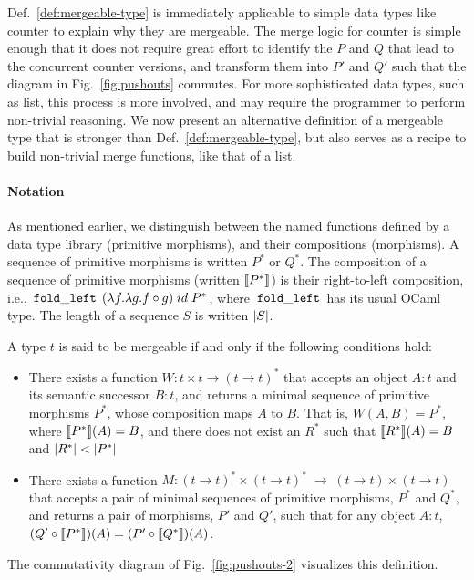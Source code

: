 Def.~\ref{def:mergeable-type} is immediately applicable to simple data
types like counter to explain why they are mergeable. The merge logic
for counter is simple enough that it does not require great effort to
identify the $P$ and $Q$ that lead to the concurrent counter versions,
and transform them into $P'$ and $Q'$ such that the diagram in
Fig.~\ref{fig:pushouts} commutes. For more
sophisticated data types, such as list, this process is more involved,
and may require the programmer to perform non-trivial reasoning. We
now present an alternative definition of a mergeable type that is
stronger than Def.~\ref{def:mergeable-type}, but also serves as a
recipe to build non-trivial merge functions, like that of a list.

\paragraph{Notation} As mentioned earlier, we distinguish between the
named functions defined by a data type library (primitive morphisms),
and their compositions (morphisms). A sequence of primitive morphisms
is written $P^*$ or $Q^*$. The composition of a sequence of primitive
morphisms (written $\llbracket P^* \rrbracket$) is their right-to-left composition,
i.e., $\,{\tt fold\_left}\,\;(\lambda f.\lambda g. f \circ g)\; id\; P^*$,
where $\,{\tt fold\_left}\,$ has its usual OCaml type. The length of a
sequence $S$ is written $\left|S\right|$.

\begin{definition} 
\label{def:mergeable-type-2}
A type $t$ is said to be mergeable if and only if the following
conditions hold:
\begin{itemize}
  \item There exists a function $W: t \times t \rightarrow (t
  \rightarrow t)^*$ that accepts an object $A:t$ and its
  semantic successor $B:t$, and returns a minimal sequence of
  primitive morphisms $P^*$, whose composition maps $A$ to $B$. That
  is, $W(A,B) = P^*$, where $\llbracket P^* \rrbracket(A) = B$, and there does not
  exist an $R^*$ such that $\llbracket R^* \rrbracket(A) = B$ and $\left|R^*\right| <
  \left|P^*\right|$

  \item There exists a function $M: (t \rightarrow t)^*\!\times\!(t
  \rightarrow t)^* \;\rightarrow\; (t \rightarrow t)\!\times\!(t
  \rightarrow t)$ that accepts a pair of minimal sequences of
  primitive morphisms, $P^*$ and $Q^*$, and returns a pair of morphisms,
  $P'$ and $Q'$, such that for any object $A:t$, $(Q' \circ
  \llbracket P^* \rrbracket)(A) = (P' \circ \llbracket Q^* \rrbracket)(A)$.
\end{itemize}
The commutativity diagram of Fig.~\ref{fig:pushouts-2} visualizes this
definition.
\end{definition}

